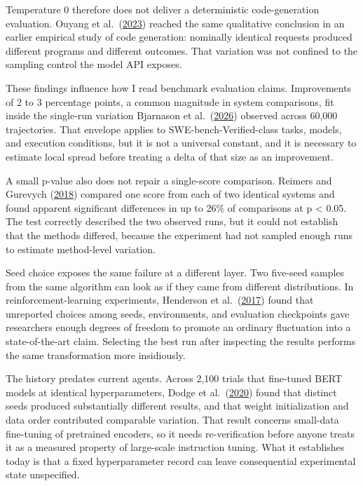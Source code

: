 Temperature 0 therefore does not deliver a deterministic code-generation evaluation. Ouyang et al.~(\href{https://arxiv.org/abs/2308.02828}{2023}) reached the same qualitative conclusion in an earlier empirical study of code generation: nominally identical requests produced different programs and different outcomes. That variation was not confined to the sampling control the model API exposes.

These findings influence how I read benchmark evaluation claims. Improvements of 2 to 3 percentage points, a common magnitude in system comparisons, fit inside the single-run variation Bjarnason et al.~(\href{https://arxiv.org/abs/2602.07150}{2026}) observed across 60,000 trajectories. That envelope applies to SWE-bench-Verified-class tasks, models, and execution conditions, but it is not a universal constant, and it is necessary to estimate local spread before treating a delta of that size as an improvement.

A small p-value also does not repair a single-score comparison. Reimers and Gurevych (\href{https://arxiv.org/abs/1803.09578}{2018}) compared one score from each of two identical systems and found apparent significant differences in up to 26\% of comparisons at p \textless{} 0.05. The test correctly described the two observed runs, but it could not establish that the methods differed, because the experiment had not sampled enough runs to estimate method-level variation.

Seed choice exposes the same failure at a different layer. Two five-seed samples from the same algorithm can look as if they came from different distributions. In reinforcement-learning experiments, Henderson et al.~(\href{https://arxiv.org/abs/1709.06560}{2017}) found that unreported choices among seeds, environments, and evaluation checkpoints gave researchers enough degrees of freedom to promote an ordinary fluctuation into a state-of-the-art claim. Selecting the best run after inspecting the results performs the same transformation more insidiously.

The history predates current agents. Across 2,100 trials that fine-tuned BERT models at identical hyperparameters, Dodge et al.~(\href{https://arxiv.org/abs/2002.06305}{2020}) found that distinct seeds produced substantially different results, and that weight initialization and data order contributed comparable variation. That result concerns small-data fine-tuning of pretrained encoders, so it needs re-verification before anyone treats it as a measured property of large-scale instruction tuning. What it establishes today is that a fixed hyperparameter record can leave consequential experimental state unspecified.

